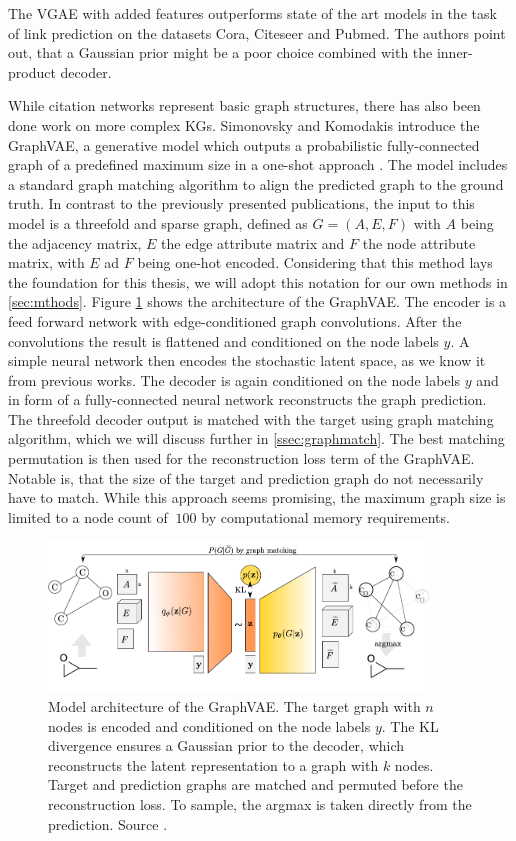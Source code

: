 The VGAE with added features outperforms state of the art models in the task of link prediction on the datasets Cora, Citeseer and Pubmed. The authors point out, that a Gaussian prior might be a poor choice combined with the inner-product decoder.

While citation networks represent basic graph structures, there has also been done work on more complex KGs.
Simonovsky and Komodakis introduce the GraphVAE, a generative model which outputs a probabilistic fully-connected graph of a predefined maximum size
in a one-shot approach \cite{simonovsky_graphvae_2018}. The model includes a standard graph matching algorithm to align the predicted graph to the ground truth. In contrast to the previously presented publications, the input to this model is a threefold and sparse graph, defined as $G=(A, E, F)$ with $A$ being the adjacency matrix, $E$ the edge attribute matrix and $F$ the node attribute matrix, with $E$ ad $F$ being one-hot encoded. Considering that this method lays the foundation for this thesis, we will adopt this notation for our own methods in \ref{sec:mthods}. Figure \ref{fig:graphvaefull} shows the architecture of the GraphVAE. The encoder is a feed forward network with edge-conditioned graph convolutions. After the convolutions the result is flattened and conditioned on the node labels $y$. A simple neural network then encodes the stochastic latent space, as we know it from previous works. The decoder is again conditioned on the node labels $y$ and in form of a fully-connected neural network reconstructs the graph prediction. The threefold decoder output is matched with the target using graph matching algorithm, which we will discuss further in \ref{ssec:graphmatch}. The best matching permutation is then used for the reconstruction loss term of the GraphVAE. Notable is, that the size of the target and prediction graph do not necessarily have to match. While this approach seems promising, the maximum graph size is limited to a node count of $~100$ by computational memory requirements.

\begin{figure}[h]
    \centering
    \includegraphics[width=0.9\textwidth]{data/images/GraphVAEfull.png}
    \caption{Model architecture of the GraphVAE. The target graph with $n$ nodes is encoded and conditioned on the node labels $y$. The KL divergence ensures a Gaussian prior to the decoder, which reconstructs the latent representation to a graph with $k$ nodes. Target and prediction graphs are matched and permuted before the reconstruction loss. To sample, the argmax is taken directly from the prediction. Source \cite{simonovsky_graphvae_2018}.}
    \label{fig:graphvaefull}
\end{figure}

